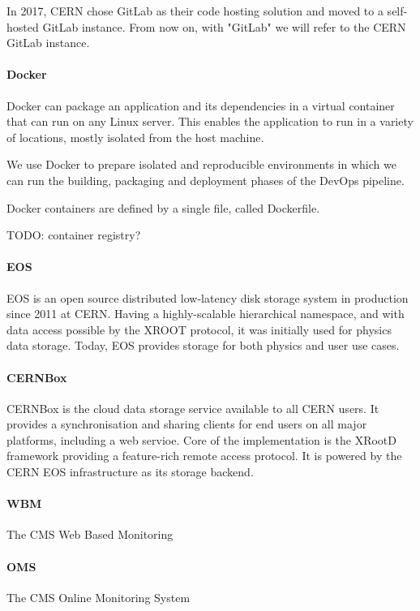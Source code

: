 In 2017, CERN chose GitLab as their code hosting solution and moved to a self-hosted GitLab instance. From now on, with "GitLab" we will refer to the CERN GitLab instance.

\paragraph{Docker}

Docker can package an application and its dependencies in a virtual container that can run on any Linux server. This enables the application to run in a variety of locations, mostly isolated from the host machine.

We use Docker to prepare isolated and reproducible environments in which we can run the building, packaging and deployment phases of the DevOps pipeline.

Docker containers are defined by a single file, called Dockerfile.

TODO: container registry?

\paragraph{EOS}

EOS \cite{Peters_2015} is an open source distributed low-latency disk storage system in production since 2011 at CERN. Having a highly-scalable hierarchical namespace, and with data access possible by the XROOT protocol, it was initially used for physics data storage. Today, EOS provides storage for both physics and user use cases.

\paragraph{CERNBox}

CERNBox \cite{Mascetti_2015} is the cloud data storage service available to all CERN users. It provides a synchronisation and sharing clients for end users on all major platforms, including a web servioe. Core of the implementation is the XRootD framework providing a feature-rich remote access protocol.  It is powered by the CERN EOS infrastructure as its storage backend.

\paragraph{WBM} The CMS Web Based Monitoring \cite{badgett2014web}

\paragraph{OMS} The CMS Online Monitoring System \cite{Andre2649402} 

